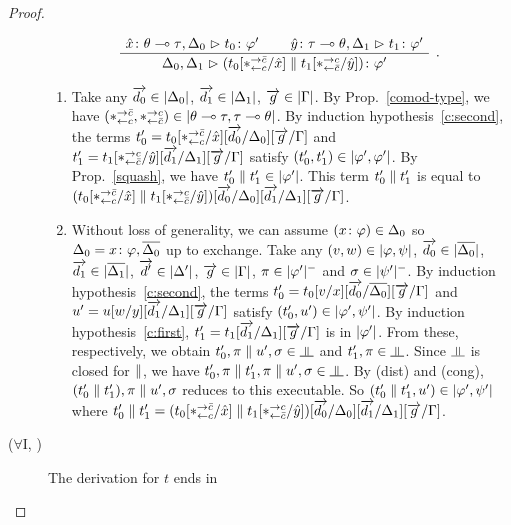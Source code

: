 \begin{proof}
\begin{description}
       \[
       \aseq{\tj{\hat x}{\theta\limp\tau},\D_0}{\tj{t_0}{\phi'}}
       \aseq{\tj{\hat y}{\tau\limp\theta},\D_1}{\tj{t_1}{\phi'}}
       \bseq{\D_0,\D_1}{\tj{(t_0[\comodL/\hat x]\conc t_1[\comodR/\hat
       y])}{\phi'}}
       \DisplayProof\enspace.
       \]
       \begin{enumerate}[label=\textit{(\arabic{*})}]
	\item Take any
	      $\overrightarrow{d_0}\in|{\Delta_0}|$,
	      $\overrightarrow{d_1}\in|{\Delta_1}|$,
	      $\overrightarrow{g}  \in|{\Gamma}|$.
	      By Prop.~\ref{comod-type}, we have
	      $(\ast^{\rightarrow {\bar{c}}}_{\leftarrow{c}},\ast^{\rightarrow {c}}_{\leftarrow{\bar{c}}})\in|{\theta\multimap\tau,\tau\multimap\theta}|$.
	      By induction hypothesis~\ref{c:second}, the terms
	      $t_0'=t_0[\ast^{\rightarrow {\bar{c}}}_{\leftarrow{c}}/\hat x][\overrightarrow{d_0}/\Delta_0][\overrightarrow g/\Gamma]$
	      and
	      $t_1'=t_1[\ast^{\rightarrow {c}}_{\leftarrow{\bar{c}}}/\hat y][\overrightarrow{d_1}/\Delta_1][\overrightarrow g/\Gamma]$
	      satisfy
	      $(t_0',t_1')\in|{\varphi',\varphi'}|$.
	      By Prop.~\ref{squash}, we have $t_0'\parallel
	      t_1'\in|{\varphi'}|$.
	      This term $t_0'\parallel t_1'$ is equal to
	      $(t_0[\ast^{\rightarrow {\bar{c}}}_{\leftarrow{c}}/\hat x]\parallel t_1[\ast^{\rightarrow {c}}_{\leftarrow{\bar{c}}}/\hat
	      y])[\overrightarrow{d_0}/\Delta_0][\overrightarrow{d_1}/\Delta_1][\overrightarrow g/\Gamma]$.
	\item Without loss of generality,
	      we can assume $({x} \colon{\varphi})\in\Delta_0$ so
	      $\Delta_0 ={x} \colon{\varphi}, \overline{\Delta_0}$ up to exchange.
	      Take any
	      $(v,w)\in|{\varphi,\psi}|$,
	      $\overrightarrow{d_0}\in|{\overline{\Delta_0}}|$,
	      $\overrightarrow{d_1}\in|{\overline{\Delta_1}}|$,
	      $\overrightarrow{d'}\in|{\Delta'}|$,
	      $\overrightarrow g\in |{\Gamma}|$,
	      $\pi\in|{\varphi'}|^-$ and
	      $\sigma\in|{\psi'}|^-$.
	      By induction hypothesis~\ref{c:second},
	      the terms $t_0'=t_0[v/x][\overrightarrow{d_0}/\overline{\Delta_0}][\overrightarrow
	      g/\Gamma]$
	      and
	      $u'=u[w/y][\overrightarrow{d_1}/\Delta_1][\overrightarrow g/\Gamma]$
	      satisfy
	      $(t_0',u')\in|{\varphi',\psi'}|$.
	      By induction hypothesis~\ref{c:first},
	      $t_1'=t_1[\overrightarrow{d_1}/\Delta_1][\overrightarrow g/\Gamma]$ is in $|{\varphi'}|$.
	      From these, respectively, we obtain
	      $t_0',\pi\conc u',\sigma\in\bbot$
	      and
	      $t_1',\pi\in\bbot$.
	      Since $\bbot$ is closed for $\parallel$,
	      we have $t_0',\pi\conc t_1',\pi\conc u',\sigma\in\bbot$.
	      By (dist) and (cong),
	      $(t_0'\parallel t_1'),\pi\parallel u',\sigma$ reduces
	      to this executable.
	      So $(t_0'\parallel t_1',u')\in|{\varphi',\psi'}|$
	      where $t_0'\parallel t_1' = (t_0[\ast^{\rightarrow {\bar{c}}}_{\leftarrow{c}}/\hat x]\parallel
	      t_1[\ast^{\rightarrow {c}}_{\leftarrow{\bar{c}}}/\hat y])[\overrightarrow{d_0}/\Delta_0][\overrightarrow{d_1}/\Delta_1][\overrightarrow g/\Gamma]$.
       \end{enumerate}
  \item[($\forall$I, \textminus)]
       The derivation for $t$ ends in

\end{description}
\end{proof}
